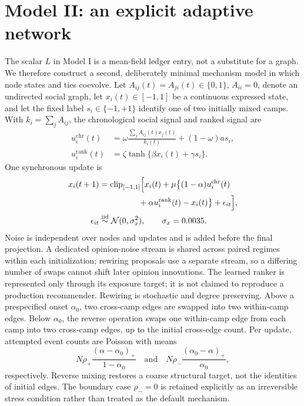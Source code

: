 \documentclass[10pt,a4paper]{article}
\begin{document}
\section{Model II: an explicit adaptive network}

The scalar $L$ in Model I is a mean-field ledger entry, not a substitute for a graph. We therefore construct a second, deliberately minimal mechanism model in which node states and ties coevolve. Let $A_{ij}(t)=A_{ji}(t)\in\{0,1\}$, $A_{ii}=0$, denote an undirected social graph, let $x_i(t)\in[-1,1]$ be a continuous expressed state, and let the fixed label $s_i\in\{-1,+1\}$ identify one of two initially mixed camps. With $k_i=\sum_jA_{ij}$, the chronological social signal and ranked signal are
\begin{align}
u_i^{\mathrm{chr}}(t)
 &=\omega\frac{\sum_jA_{ij}(t)x_j(t)}{k_i(t)}
 +(1-\omega)a s_i,\\
u_i^{\mathrm{rank}}(t)
 &=\zeta\tanh\{\beta x_i(t)+\gamma s_i\}.
\end{align}
One synchronous update is
\begin{equation}
\begin{aligned}
x_i(t+1)
&=\operatorname{clip}_{[-1,1]}\Bigl[x_i(t)
 +\mu\bigl\{(1-\alpha)u_i^{\mathrm{chr}}(t)\\
&\hspace{4.8em}+\alpha u_i^{\mathrm{rank}}(t)-x_i(t)\bigr\}
 +\epsilon_{it}\Bigr],\\
\epsilon_{it}&\overset{\mathrm{iid}}{\sim}\mathcal N(0,\sigma_x^2),
\qquad \sigma_x=0.0035.
\end{aligned}
\label{eq:network-opinion}
\end{equation}
Noise is independent over nodes and updates and is added before the final projection. A dedicated opinion-noise stream is shared across paired regimes within each initialization; rewiring proposals use a separate stream, so a differing number of swaps cannot shift later opinion innovations. The learned ranker is represented only through its exposure target; it is not claimed to reproduce a production recommender. Rewiring is stochastic and degree preserving. Above a prespecified onset $\alpha_0$, two cross-camp edges are swapped into two within-camp edges. Below $\alpha_0$, the reverse operation swaps one within-camp edge from each camp into two cross-camp edges, up to the initial cross-edge count. Per update, attempted event counts are Poisson with means
\begin{equation}
N\rho_+\frac{(\alpha-\alpha_0)_+}{1-\alpha_0}
\quad\text{and}\quad
N\rho_-\frac{(\alpha_0-\alpha)_+}{\alpha_0},
\label{eq:rewiring-intensity}
\end{equation}
respectively. Reverse mixing restores a coarse structural target, not the identities of initial edges. The boundary case $\rho_-=0$ is retained explicitly as an irreversible stress condition rather than treated as the default mechanism.
\end{document}
